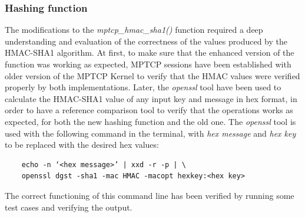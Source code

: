 \subsubsection{Hashing function}
The modifications to the \textit{mptcp\_hmac\_sha1()} function required a deep understanding and evaluation of the correctness of the values produced by the HMAC-SHA1 algorithm. At first, to make sure that the enhanced version of the function was working as expected, MPTCP sessions have been established with older version of the MPTCP Kernel to verify that the HMAC values were verified properly by both implementations. Later, the \textit{openssl} tool have been used to calculate the HMAC-SHA1 value of any input key and message in hex format, in order to have a reference comparison tool to verify that the operations works as expected, for both the new hashing function and the old one. The \textit{openssl} tool is used with the following command in the terminal, with \textit{hex message} and \textit{hex key} to be replaced with the desired hex values:

\begin{verbatim}
	echo -n ‘<hex message>’ | xxd -r -p | \
	openssl dgst -sha1 -mac HMAC -macopt hexkey:<hex key>
\end{verbatim}

The correct functioning of this command line has been verified by running some test cases \cite{rfc2202} and verifying the output.

